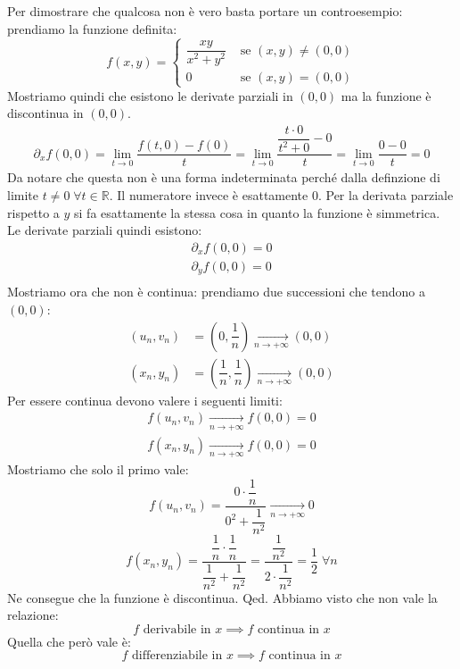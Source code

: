 {	Per dimostrare che qualcosa non è vero basta portare un controesempio: prendiamo la funzione definita:
	\begin{equation*}
		f(x, y) = 
		\begin{cases}
			\dfrac{xy}{x^2 + y^2} &\text{ se }(x, y) \neq (0, 0)\\
			0 &\text{ se }(x, y) = (0, 0)
		\end{cases}
	\end{equation*}
	Mostriamo quindi che esistono le derivate parziali in $(0, 0)$ ma la funzione è discontinua in $(0, 0)$.
	\begin{align*}
		\partial_x f(0, 0) = \lim_{t \to 0} \dfrac{f(t, 0) - f(0)}{t} = \lim_{t \to 0} \dfrac{\dfrac{t\cdot 0}{t^2 + 0} - 0}{t} = \lim_{t \to 0} \dfrac{0 - 0}{t} = 0
	\end{align*}
	Da notare che questa non è una forma indeterminata perché dalla definzione di limite $t \neq 0 \; \forall t \in \mathbb{R}$. Il numeratore invece è esattamente $0$. Per la derivata parziale rispetto a $y$ si fa esattamente la stessa cosa in quanto la funzione è simmetrica. Le derivate parziali quindi esistono:
	\begin{align*}
		\partial_x f(0, 0) = 0\\
		\partial_y f(0, 0) = 0\\
	\end{align*}
	Mostriamo ora che non è continua: prendiamo due successioni che tendono a $(0, 0)$:
	\begin{align*}
		(u_n, v_n) &= \left(0, \dfrac{1}{n}\right) \xrightarrow[n \to + \infty]{} (0, 0)\\
		(x_n, y_n) &= \left(\dfrac{1}{n}, \dfrac{1}{n}\right) \xrightarrow[n \to + \infty]{} (0, 0)
	\end{align*}
	Per essere continua devono valere i seguenti limiti:
	\begin{align*}
		f(u_n, v_n) \xrightarrow[n \to +\infty]{} f(0, 0) = 0\\
		f(x_n, y_n) \xrightarrow[n \to +\infty]{} f(0, 0) = 0
	\end{align*}
	Mostriamo che solo il primo vale:
	\begin{equation*}
		f(u_n, v_n) = \dfrac{0 \cdot \dfrac{1}{n}}{0^2 + \dfrac{1}{n^2}} \xrightarrow[n \to +\infty]{} 0
	\end{equation*}
	\begin{equation*}
		f(x_n, y_n) = \dfrac{\dfrac{1}{n} \cdot \dfrac{1}{n}}{\dfrac{1}{n^2} + \dfrac{1}{n^2}} = \dfrac{\dfrac{1}{n^2}}{2 \cdot \dfrac{1}{n^2}} = \dfrac{1}{2} \; \forall n
	\end{equation*}
	Ne consegue che la funzione è discontinua.
	\hfill Qed.
}
Abbiamo visto che non vale la relazione:
\begin{equation*}
	f \text{ derivabile in } x \implies f \text{ continua in } x
\end{equation*}
Quella che però vale è:
\begin{equation*}
	f \text{ differenziabile in } x \implies f \text{ continua in } x
\end{equation*}

